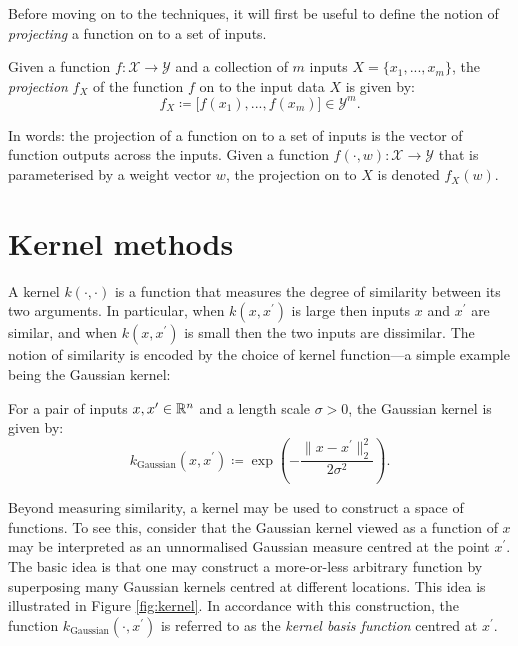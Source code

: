 \begin{refsection}
Before moving on to the techniques, it will first be useful to define the notion of \textit{projecting} a function on to a set of inputs.

\begin{definition}\label{def:project} Given a function $f:\mathcal{X}\to\mathcal{Y}$ and a collection of $m$ inputs $X=\{x_1,...,x_m\}$, the \textit{projection} $f_X$ of the function $f$ on to the input data $X$ is given by:
\begin{equation}
    f_X \coloneqq \big[f(x_1), ..., f(x_m)\big] \in \mathcal{Y}^m.
\end{equation}
\end{definition}
In words: the projection of a function on to a set of inputs is the vector of function outputs across the inputs. Given a function $f(\cdot,w):\mathcal{X}\to\mathcal{Y}$ that is parameterised by a weight vector $w$, the projection on to $X$ is denoted $f_X(w)$.

\section{Kernel methods}

A kernel $k(\cdot,\cdot)$ is a function that measures the degree of similarity between its two arguments. In particular, when $k(x,x^\prime)$ is large then inputs $x$ and $x^\prime$ are similar, and when $k(x,x^\prime)$ is small then the two inputs are dissimilar. The notion of similarity is encoded by the choice of kernel function---a simple example being the Gaussian kernel:

\begin{example}\label{def:kgauss} For a pair of inputs $x,x^\prime\in\mathbb{R}^n$ and a length scale $\sigma>0$, the Gaussian kernel is given by:
\begin{equation}
    k_{\mathrm{Gaussian}}(x,x^\prime)\coloneqq \exp \left( - \frac{\|x-x^\prime\|_2^2}{2\sigma^2}\right).
\end{equation}
\end{example}

Beyond measuring similarity, a kernel may be used to construct a space of functions. To see this, consider that the Gaussian kernel viewed as a function of $x$ may be interpreted as an unnormalised Gaussian measure centred at the point $x^\prime$. The basic idea is that one may construct a more-or-less arbitrary function by superposing many Gaussian kernels centred at different locations. This idea is illustrated in Figure \ref{fig:kernel}. In accordance with this construction, the function $k_{\mathrm{Gaussian}}(\cdot,x^\prime)$ is referred to as the \textit{kernel basis function} centred at $x^\prime$.


\end{refsection}
